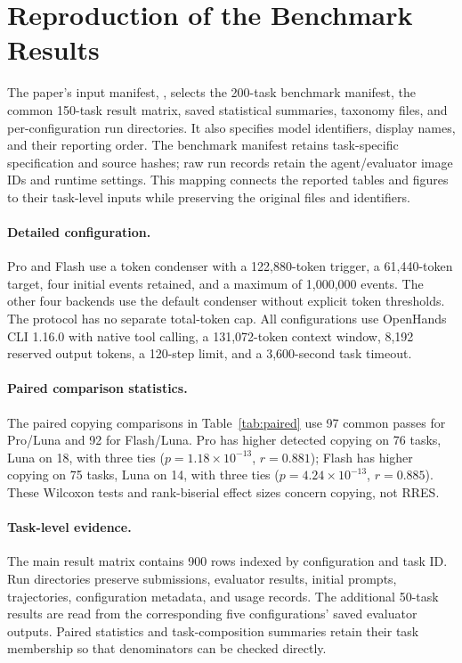 \documentclass[acmsmall,screen,review,anonymous,nonacm]{acmart}
\begin{document}
\section{Reproduction of the Benchmark Results}
\label{app:artifact}
\label{app:reproduction}

The paper's input manifest, , selects the
200-task benchmark manifest, the common 150-task result matrix, saved
statistical summaries, taxonomy files, and per-configuration run directories.
It also specifies model identifiers, display names, and their reporting order.
The benchmark manifest retains task-specific specification and source hashes;
raw run records retain the agent/evaluator image IDs and runtime settings.
This mapping connects the reported tables and figures to their task-level
inputs while preserving the original files and identifiers.

\paragraph{Detailed configuration.}
Pro and Flash use a token condenser with a 122,880-token trigger, a 61,440-token
target, four initial events retained, and a maximum of 1,000,000 events. The
other four backends use the default condenser without explicit token
thresholds. The protocol has no separate total-token cap. All configurations
use OpenHands CLI 1.16.0 with native tool calling, a 131,072-token context
window, 8,192 reserved output tokens, a 120-step limit, and a 3,600-second
task timeout.

\paragraph{Paired comparison statistics.}
The paired copying comparisons in Table~\ref{tab:paired} use 97 common passes
for Pro/Luna and 92 for Flash/Luna. Pro has higher detected copying on 76 tasks,
Luna on 18, with three ties ($p=1.18\times10^{-13}$, $r=0.881$); Flash has
higher copying on 75 tasks, Luna on 14, with three ties
($p=4.24\times10^{-13}$, $r=0.885$). These Wilcoxon tests and rank-biserial
effect sizes concern copying, not RRES.

\paragraph{Task-level evidence.}
The main result matrix contains 900 rows indexed by configuration and task ID.
Run directories preserve submissions, evaluator results, initial prompts,
trajectories, configuration metadata, and usage records. The additional
50-task results are read from the corresponding five configurations' saved
evaluator outputs. Paired statistics and task-composition summaries retain
their task membership so that denominators can be checked directly.
\end{document}
